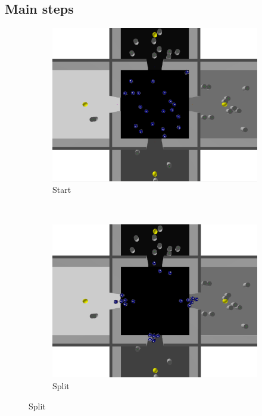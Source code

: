 \subsection{Main steps}

\begin{figure}[h!]
        \centering
        \begin{subfigure}[b]{0.5\textwidth}
            \includegraphics[width=\textwidth]{images/1_start.png}
            \caption{Start}
        \end{subfigure}%
        ~
        \begin{subfigure}[b]{0.5\textwidth}
            \includegraphics[width=\textwidth]{images/2_split.png}
            \caption{Split}
        \end{subfigure}

\end{figure}
